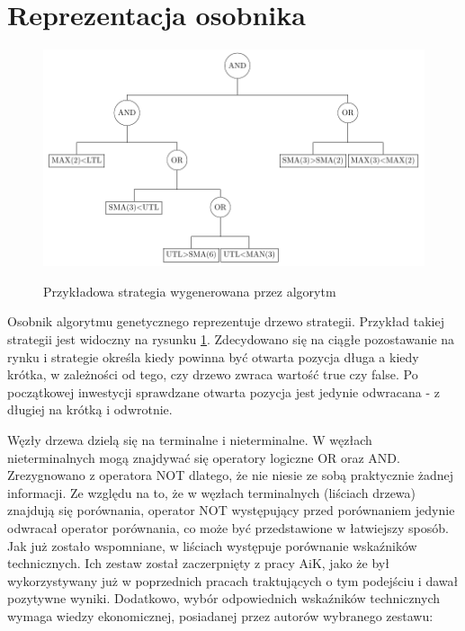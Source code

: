 \documentclass[twoside]{iisthesis}
\begin{document}
\section{Reprezentacja osobnika}

\begin{figure}[h]
\center
\caption {Przykładowa strategia wygenerowana przez algorytm}
\includegraphics[scale = 0.7]{drzewo}
\label{fig:drzewo}
\end{figure}

Osobnik algorytmu genetycznego reprezentuje drzewo strategii. Przykład takiej strategii jest widoczny na rysunku \ref{fig:drzewo}. Zdecydowano się na ciągłe pozostawanie na rynku i strategie określa kiedy powinna być otwarta pozycja długa a kiedy krótka, w zależności od tego, czy drzewo zwraca wartość true czy false. Po początkowej inwestycji sprawdzane otwarta pozycja jest jedynie odwracana - z długiej na krótką i odwrotnie.

Węzły drzewa dzielą się na terminalne i nieterminalne. W węzłach nieterminalnych mogą znajdywać się operatory logiczne OR oraz AND. Zrezygnowano z operatora NOT dlatego, że nie niesie ze sobą praktycznie żadnej informacji. Ze względu na to, że w węzłach terminalnych (liściach drzewa) znajdują się porównania, operator NOT występujący przed porównaniem jedynie odwracał operator porównania, co może być przedstawione w łatwiejszy sposób.
Jak już zostało wspomniane, w liściach występuje porównanie wskaźników technicznych. Ich zestaw został zaczerpnięty z pracy AiK, jako że był wykorzystywany już w poprzednich pracach traktujących o tym podejściu i dawał pozytywne wyniki. Dodatkowo, wybór odpowiednich wskaźników technicznych wymaga wiedzy ekonomicznej, posiadanej przez autorów wybranego zestawu:
\end{document}
